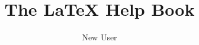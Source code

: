 \documentclass[12pt,a4paper,openany]{book}
\begin{document}
\frontmatter
\title{The \LaTeX{} Help Book}
\author{New User}
\maketitle
\tableofcontents  
\listoffigures  
\listoftables






\mainmatter

\clearpage

\backmatter
\printbibliography
\end{document}
